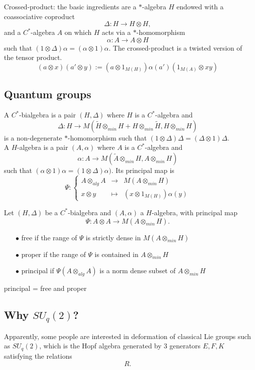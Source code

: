Crossed-product: the basic ingredients are a $*$-algebra $H$ endowed with a coassociative coproduct
\[\Delta : H \rightarrow H\otimes H,\]
and a $C^*$-algebra $A$ on which $H$ acts via a $*$-homomorphism
\[\alpha : A \rightarrow A\otimes H\]
such that $(1\otimes \Delta)\alpha = (\alpha \otimes 1) \alpha$. The crossed-product is a twisted version of the tensor product.  
\[(a\otimes x )(a'\otimes y ) := (a\otimes 1_{M(H)}) \alpha (a')(1_{M(A)}\otimes xy)\]
 
\subsection{Quantum groups}
 
A $C^*$-bialgebra is a pair $(H,\Delta)$ where $H$ is a $C^*$-algebra and 
\[\Delta: H \rightarrow M(\tilde H \otimes_{min} H + H\otimes_{min} \tilde H, H\otimes_{min} H)\]
is a non-degenerate $*$-homomorphism such that $(1\otimes \Delta) \Delta = (\Delta\otimes 1 ) \Delta$.\\

A $H$-algebra is a pair $(A,\alpha)$ where $A$ is a $C^*$-algebra and 
\[\alpha : A\rightarrow M(\tilde A \otimes_{min} H , A\otimes_{min} H)\]
such that $(\alpha\otimes 1) \alpha = (1 \otimes \Delta )\alpha)$. Its principal map is 
\[\Psi : \left\{ \begin{array}{rcl}
A\otimes_{alg} A & \rightarrow & M(A\otimes_{min} H) \\
x\otimes y & \mapsto & (x \otimes 1_{M(H)})\alpha (y)
\end{array}\right.\]

Let $(H,\Delta)$ be a $C^*$-bialgebra and $(A,\alpha)$ a $H$-algebra, with principal map
\[\Psi: A\otimes A\rightarrow M(A\otimes_{min} H).\]
\begin{itemize}
\item[$\bullet$] free if the range of $\Psi$ is strictly dense in $M(A\otimes_{min} H)$
\item[$\bullet$] proper if the range of $\Psi$ is contained in $A\otimes_{min} H$
\item[$\bullet$] principal if $\Psi(A\otimes_{alg}A )$ is a norm dense subset of $A\otimes_{min} H$
\end{itemize}
principal = free and proper

\subsection{Why $SU_q(2)$?}

Apparently, some people are interested in deformation of classical Lie groups such as $SU_q(2)$, which is the Hopf algebra generated by $3$ generators $E,F,K$ satisfying the relations 
\[R.\]

